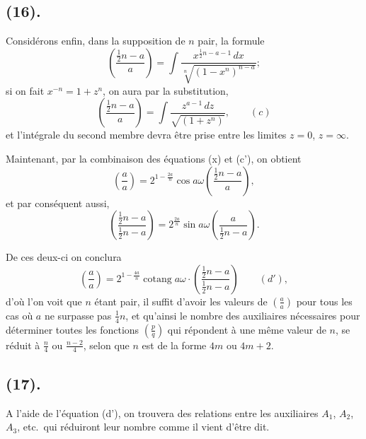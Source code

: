\documentclass{article}
\begin{document}
\subsection*{(16).}

Considérons enfin, dans la supposition de $n$ pair, la formule
\[ \left(\frac{\frac{1}{2}n-a}{a}\right)=\int\frac{x^{\frac{1}{2}n-a-1}\,dx}{\sqrt[n]{(1-x^{n})^{n-a}}}; \]
si on fait $x^{-n}=1+z^{n}$, on aura par la substitution,
\[ \left(\frac{\frac{1}{2}n-a}{a}\right)=\int\frac{z^{a-1}\,dz}{\sqrt{(1+z^{n})}},\qquad(c) \]
et l'intégrale du second membre devra être prise entre les limites $z=0$, $z=\infty$.

Maintenant, par la combinaison des équations (x) et (c'), on obtient
\[ \left(\frac{a}{a}\right)=2^{1-\frac{2a}{n}}\cos a\omega\left(\frac{\frac{1}{2}n-a}{a}\right), \]
et par conséquent aussi,
\[ \left(\frac{\frac{1}{2}n-a}{\frac{1}{2}n-a}\right)=2^{\frac{2a}{n}}\sin a\omega\left(\frac{a}{\frac{1}{2}n-a}\right). \]

De ces deux-ci on conclura
\[ \left(\frac{a}{a}\right)=2^{1-\frac{4a}{n}}\operatorname{cotang}a\omega\cdot\left(\frac{\frac{1}{2}n-a}{\frac{1}{2}n-a}\right)\qquad(d'), \]
d'où l'on voit que $n$ étant pair, il suffit d'avoir les valeurs de $\left(\frac{a}{a}\right)$ pour tous les cas où $a$ ne surpasse pas $\frac{1}{4}n$, et qu'ainsi le nombre des auxiliaires nécessaires pour déterminer toutes les fonctions $\left(\frac{p}{q}\right)$ qui répondent à une même valeur de $n$, se réduit à $\frac{n}{4}$ ou $\frac{n-2}{4}$, selon que $n$ est de la forme $4m$ ou $4m+2$.

\subsection*{(17).}

A l'aide de l'équation (d'), on trouvera des relations entre les auxiliaires $A_{1}$, $A_{2}$, $A_{3}$, etc.\ qui réduiront leur nombre comme il vient d'être dit.
\end{document}
